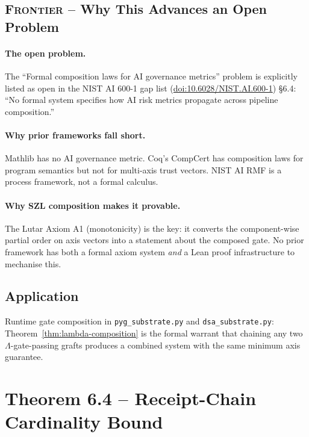 \subsection*{\textsc{Frontier} -- Why This Advances an Open Problem}

\paragraph{The open problem.}
The ``Formal composition laws for AI governance metrics'' problem is
explicitly listed as open in the NIST AI 600-1 gap list
(\href{https://doi.org/10.6028/NIST.AI.600-1}{doi:10.6028/NIST.AI.600-1})
\S{}6.4: ``No formal system specifies how AI risk metrics propagate
across pipeline composition.''

\paragraph{Why prior frameworks fall short.}
Mathlib has no AI governance metric.  Coq's CompCert has composition
laws for program semantics but not for multi-axis trust vectors.
NIST AI RMF is a process framework, not a formal calculus.

\paragraph{Why SZL composition makes it provable.}
The Lutar Axiom A1 (monotonicity) is the key: it converts the
component-wise partial order on axis vectors into a statement about
the composed gate.  No prior framework has both a formal axiom system
\emph{and} a Lean proof infrastructure to mechanise this.

\subsection*{Application}

Runtime gate composition in \texttt{pyg\_substrate.py} and
\texttt{dsa\_substrate.py}: Theorem~\ref{thm:lambda-composition}
is the formal warrant that chaining any two \(\Lambda\)-gate-passing grafts
produces a combined system with the same minimum axis guarantee.

\section{Theorem 6.4 -- Receipt-Chain Cardinality Bound}
\label{sec:thm04}

